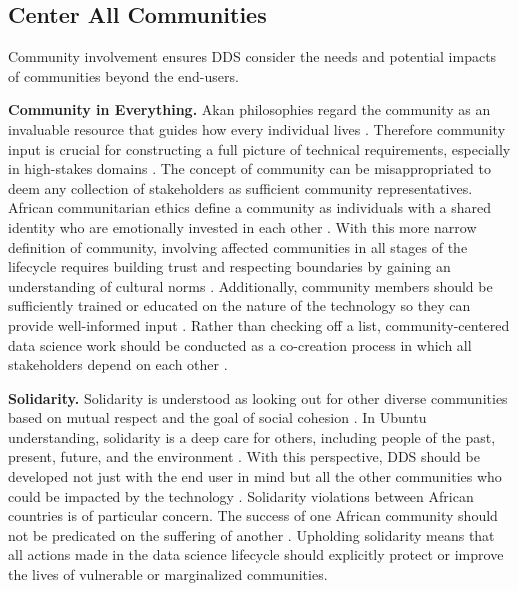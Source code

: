 \subsection{Center All Communities} 
Community involvement ensures DDS consider the needs and potential impacts of communities beyond the end-users. 

\textbf{Community in Everything.}
\label{sec:com_every}
Akan philosophies regard the community as an invaluable resource that guides how every individual lives \cite{wiredu2004akan,metz2021african, coetzee2004particularity, mhlambi2023decolonizing,gwagwa2022role}. Therefore community input is crucial for constructing a full picture of technical requirements, especially in high-stakes domains \cite{sinha2023principlesafrofeminist,mhlambi2020from, eke2023towards}.
The concept of community can be misappropriated to deem any collection of stakeholders as sufficient community representatives. African communitarian ethics define a community as individuals with a shared identity who are emotionally invested in each other \cite{nwankwo2019africa,sinha2023principlesafrofeminist, ruttkampbloem2023epistemic, gyekye2004person}. 
With this more narrow definition of community, involving affected communities in all stages of the lifecycle requires building trust and respecting boundaries by gaining an understanding of cultural norms \cite{abebe2021narratives, ade-ibijola2023artificial}. Additionally, community members should be sufficiently trained or educated on the nature of the technology so they can provide well-informed input \cite{shilongo2023creativity,adelani2022masakhaner, plantinga2024responsible}. Rather than checking off a list, community-centered data science work should be conducted as a co-creation process in which all stakeholders depend on each other \cite{langat2020how, kohnert2022machine, abebe2021narratives, adelani2022masakhaner,nwankwo2019africa, lauer2017african, kiemde2022towards}.

\textbf{Solidarity.}
Solidarity is understood as looking out for other diverse communities based on mutual respect and the goal of social cohesion \cite{gwagwa2019recommendations, mhlambi2020from}. In Ubuntu understanding, solidarity is a deep care for others, including people of the past, present, future, and the environment \cite{mhlambi2023decolonizing,gwagwa2019recommendations, okolo2023responsible, dignum2023responsible, gwagwa2022role}. With this perspective, DDS should be developed not just with the end user in mind but all the other communities who could be impacted by the technology
\cite{gwagwa2022role,olojede2023towards,gyekye2004person}.
Solidarity violations between African countries is of particular concern. The success of one African community should not be predicated on the suffering of another \cite{ndjungu2020blood, biko2004black}. Upholding solidarity means that all actions made in the data science lifecycle should explicitly protect or improve the lives of vulnerable or marginalized communities. 

